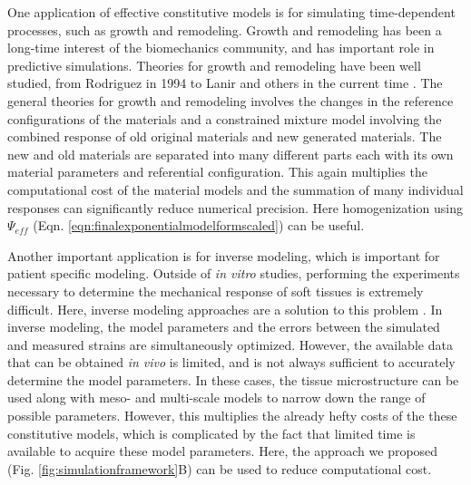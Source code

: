    One application of effective constitutive models is for simulating time-dependent processes, such as growth and remodeling. Growth and remodeling has been a long-time interest of the biomechanics community, and has important role in predictive simulations. Theories for growth and remodeling have been well studied, from Rodriguez in 1994 to Lanir and others in the current time \cite{lanir_mechanistic_2014, gleason_mixture_2004, rodriguez_stress_1994, humphrey_constrained_2002, cowin_tissue_2004, taber_biomechanics_1995}. The general theories for growth and remodeling involves the changes in the reference configurations of the materials and a constrained mixture model involving the combined response of old original materials and new generated materials. The new and old materials are separated into many different parts each with its own material parameters and referential configuration. This again multiplies the computational cost of the material models and the summation of many individual responses can significantly reduce numerical precision. Here homogenization using $\Psi_{eff}$ (Eqn. \ref{eqn:finalexponentialmodelformscaled}) can be useful. 
    

    Another important application is for inverse modeling, which is important for patient specific modeling. Outside of \textit{in vitro} studies, performing the experiments necessary to determine the mechanical response of soft tissues is extremely difficult. Here, inverse modeling approaches are a solution to this problem \cite{lee_inverse_2014, aggarwal_inverse_2015, aggarwal_patient_2013, kim_inverse_2009, liu_inverse_2013}. In inverse modeling, the model parameters and the errors between the simulated and measured strains are simultaneously optimized. However, the available data that can be obtained \textit{in vivo} is limited, and is not always sufficient to accurately determine the model parameters. In these cases, the tissue microstructure can be used along with meso- and multi-scale models to narrow down the range of possible parameters. However, this multiplies the already hefty costs of the these constitutive models, which is complicated by the fact that limited time is available to acquire these model parameters. Here, the approach we proposed (Fig. \ref{fig:simulationframework}B) can be used to reduce computational cost.


